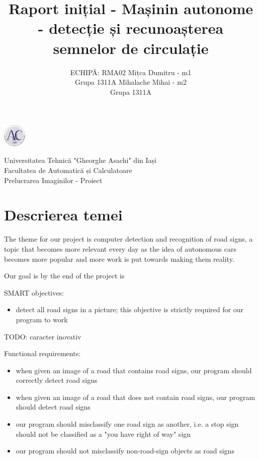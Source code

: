 \documentclass{article}
\title{Raport inițial - Mașinin autonome - detecție și recunoașterea semnelor de circulație}
\author{%
 ECHIPĂ: RMA02
 \AND
 Mițca Dumitru - m1 \\
 Grupa 1311A
 \AND
 Mihalache Mihai - m2 \\
 Grupa 1311A
}
\begin{document}
\noindent\begin{minipage}{0.1\textwidth}%
\includegraphics[width=1.1cm]{imagini/logo_AC.png}
\end{minipage}%
\hfill%
\begin{minipage}{1\textwidth}\raggedright
Universitatea Tehnică "Gheorghe Asachi" din Iași\\
Facultatea de Automatică și Calculatoare\\
Prelucrarea Imaginilor - Proiect
\end{minipage}

\maketitle

\section{Descrierea temei}


The theme for our project is computer detection and recognition of road signs, a topic that becomes
more relevant every day as the idea of autonomous cars becomes more popular and more work is put
towards making them reality.

Our goal is by the end of the project is

SMART objectives:
\begin{itemize}
  \item detect all road signs in a picture; this objective is strictly required for our program to work
\end{itemize}

TODO: caracter inovativ

Functional requirements:
\begin{itemize}
  \item when given an image of a road that contains road signs, our program should correctly detect road signs
  \item when given an image of a road that does not contain road signs, our program should detect road signs
  \item our program should misclassify one road sign as another, i.e. a stop sign should not be classified as
  a "you have right of way" sign
  \item our program should not misclassify non-road-sign objects as road signs
\end{itemize}
\end{document}
